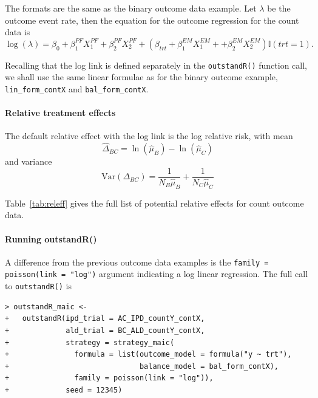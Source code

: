\documentclass[article]{jss}
\begin{document}


The formats are the same as the binary outcome data example.
Let $\lambda$ be the outcome event rate, then the equation for the outcome regression for the count data is
$$
\log(\lambda) = \beta_0 + \beta^{PF}_{1} X^{PF}_{1} + \beta^{PF}_{2 }X^{PF}_{2} + (\beta_{trt} + \beta^{EM}_{1} X^{EM}_{1} + + \beta^{EM}_{2} X^{EM}_{2}) \mathbb{I}(trt = 1).
$$

Recalling that the log link is defined separately in the \texttt{outstandR()} function call, we shall use the same linear formulae as for the binary outcome example, \texttt{lin\_form\_contX} and \texttt{bal\_form\_contX}.

\paragraph{Relative treatment effects}
The default relative effect with the log link is the log relative risk, with mean
$$
\hat{\Delta}_{BC} = \ln(\hat{\mu}_B) - \ln(\hat{\mu}_C)
$$ 
and variance
$$
\text{Var}(\Delta_{BC}) = \frac{1}{N_B \hat{\mu}_B} + \frac{1}{N_C \hat{\mu}_C}
$$ 

Table~\ref{tab:releff} gives the full list of potential relative effects for count outcome data.

\paragraph{Running outstandR()}
A difference from the previous outcome data examples is the \texttt{family = poisson(link = "log")} argument indicating a log linear regression. The full call to \texttt{outstandR()} is

\begin{verbatim}
> outstandR_maic <-
+   outstandR(ipd_trial = AC_IPD_countY_contX,
+             ald_trial = BC_ALD_countY_contX,
+             strategy = strategy_maic(
+               formula = list(outcome_model = formula("y ~ trt"),
+                              balance_model = bal_form_contX),
+               family = poisson(link = "log")),
+             seed = 12345)
\end{verbatim}
\end{document}
